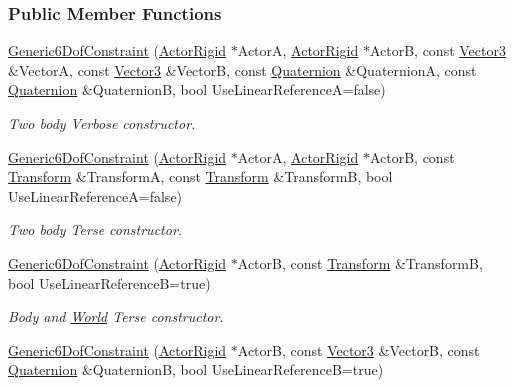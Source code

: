 \subsubsection*{Public Member Functions}
\begin{DoxyCompactItemize}
\item 
\hyperlink{classMezzanine_1_1Generic6DofConstraint_af81c1ab120f7d2df27f194ee73516a18}{Generic6DofConstraint} (\hyperlink{classMezzanine_1_1ActorRigid}{ActorRigid} $\ast$ActorA, \hyperlink{classMezzanine_1_1ActorRigid}{ActorRigid} $\ast$ActorB, const \hyperlink{classMezzanine_1_1Vector3}{Vector3} \&VectorA, const \hyperlink{classMezzanine_1_1Vector3}{Vector3} \&VectorB, const \hyperlink{classMezzanine_1_1Quaternion}{Quaternion} \&QuaternionA, const \hyperlink{classMezzanine_1_1Quaternion}{Quaternion} \&QuaternionB, bool UseLinearReferenceA=false)
\begin{DoxyCompactList}\small\item\em Two body Verbose constructor. \item\end{DoxyCompactList}\item 
\hyperlink{classMezzanine_1_1Generic6DofConstraint_a373679760f1bc180adda8ad51e20cd38}{Generic6DofConstraint} (\hyperlink{classMezzanine_1_1ActorRigid}{ActorRigid} $\ast$ActorA, \hyperlink{classMezzanine_1_1ActorRigid}{ActorRigid} $\ast$ActorB, const \hyperlink{classMezzanine_1_1Transform}{Transform} \&TransformA, const \hyperlink{classMezzanine_1_1Transform}{Transform} \&TransformB, bool UseLinearReferenceA=false)
\begin{DoxyCompactList}\small\item\em Two body Terse constructor. \item\end{DoxyCompactList}\item 
\hyperlink{classMezzanine_1_1Generic6DofConstraint_a7adce568bcf8f289744686ce129bff08}{Generic6DofConstraint} (\hyperlink{classMezzanine_1_1ActorRigid}{ActorRigid} $\ast$ActorB, const \hyperlink{classMezzanine_1_1Transform}{Transform} \&TransformB, bool UseLinearReferenceB=true)
\begin{DoxyCompactList}\small\item\em Body and \hyperlink{classMezzanine_1_1World}{World} Terse constructor. \item\end{DoxyCompactList}\item 
\hyperlink{classMezzanine_1_1Generic6DofConstraint_a41ed7866900eebbfb917ab426c21cf43}{Generic6DofConstraint} (\hyperlink{classMezzanine_1_1ActorRigid}{ActorRigid} $\ast$ActorB, const \hyperlink{classMezzanine_1_1Vector3}{Vector3} \&VectorB, const \hyperlink{classMezzanine_1_1Quaternion}{Quaternion} \&QuaternionB, bool UseLinearReferenceB=true)

\end{DoxyCompactItemize}
